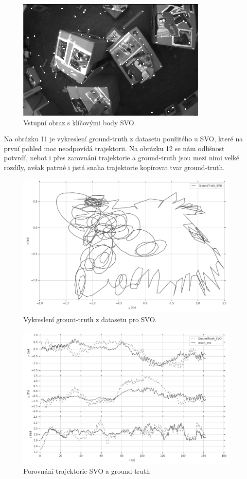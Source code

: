 \documentclass[12pt,a4paper]{article}
\begin{document}
\begin{figure}[H]
\centering
\includegraphics[scale=1]{img/SVO_rviz_2.png}
\caption{Vstupní obraz s klíčovými body SVO.}
\end{figure}

Na obrázku 11 je vykreslení ground-truth z datasetu použitého u SVO, které na první pohled moc neodpovídá trajektorii. Na obrázku 12 se nám odlišnost potvrdí, neboť i přes zarovnání trajektorie a ground-truth jsou mezi nimi velké rozdíly, avšak patrné i jistá snaha trajektorie kopírovat tvar ground-truth.

\begin{figure}[H]
\centering
\includegraphics[scale=0.5]{img/xy_SVO_gt.png}
\caption{Vykreslení grount-truth z datasetu pro SVO.}
\end{figure}

\begin{figure}[H]
\centering
\includegraphics[scale=0.5]{img/xyz_SVO.png}
\caption{Porovnání trajektorie SVO a ground-truth}
\end{figure} 
\end{document}
